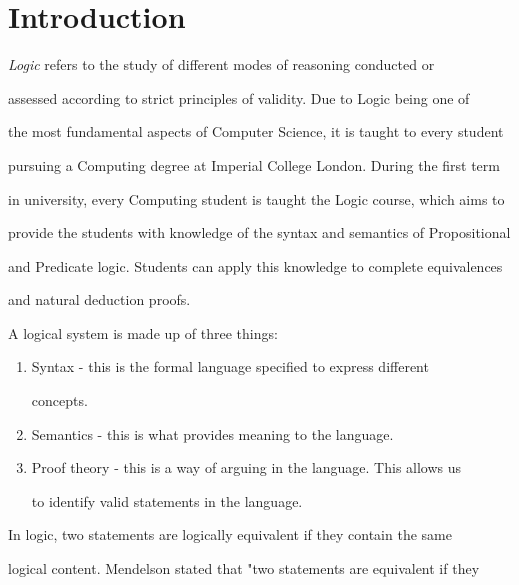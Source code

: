 \documentclass{report}
\begin{document}
\chapter{Introduction}






\emph{Logic} refers to the study of different modes of reasoning conducted or 

assessed according to strict principles of validity. Due to Logic being one of 

the most fundamental aspects of Computer Science, it is taught to every student

pursuing a Computing degree at Imperial College London. During the first term 

in university, every Computing student is taught the Logic course, which aims to

provide the students with knowledge of the syntax and semantics of Propositional 

and Predicate logic. Students can apply this knowledge to complete equivalences

and natural deduction proofs.



A logical system is made up of three things:



\begin{enumerate}

  \item Syntax - this is the formal language specified to express different

         concepts.

  \item Semantics - this is what provides meaning to the language.

  \item Proof theory - this is a way of arguing in the language. This allows us

         to identify valid statements in the language.

\end{enumerate}



In logic, two statements are logically equivalent if they contain the same

logical content. Mendelson stated that "two statements are equivalent if they
\end{document}
